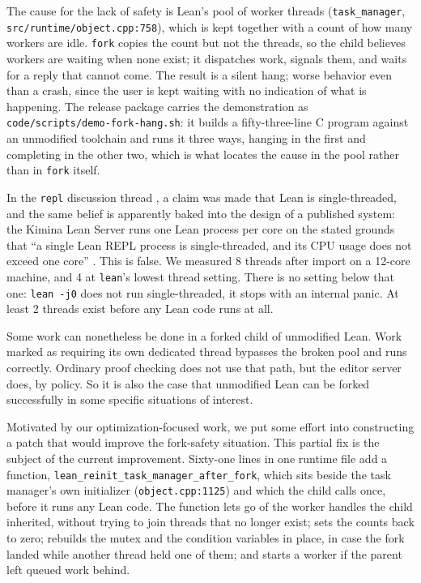 \documentclass{article}
\newcommand{\Lean}{Lean\xspace}      %
\newcommand{\lean}{\texttt{lean}\xspace}      %
\begin{document}
The cause for the lack of safety is \Lean's pool of worker threads (\texttt{task\_manager}, \texttt{src/runtime/\allowbreak object.cpp:758}), which is kept together with a count of how many workers are idle. \texttt{fork} copies the count but not the threads, so the child believes workers are waiting when none exist; it dispatches work, signals them, and waits for a reply that cannot come. The result is a silent hang; worse behavior even than a crash, since the user is kept waiting with no indication of what is happening. The release package carries the demonstration as \texttt{code/scripts/\allowbreak demo-fork-hang.sh}: it builds a fifty-three-line C program against an unmodified toolchain and runs it three ways, hanging in the first and completing in the other two, which is what locates the cause in the pool rather than in \texttt{fork} itself.

In the \texttt{repl} discussion thread \cite{repl84}, a claim was made that \Lean is single-threaded, and the same belief is apparently baked into the design of a published system: the Kimina Lean Server runs one \Lean process per core on the stated grounds that ``a single Lean REPL process is single-threaded, and its CPU usage does not exceed one core'' \cite[Sec.~3]{kimina}. This is false. We measured 8 threads after import on a 12-core machine, and 4 at \lean's lowest thread setting. There is no setting below that one: \texttt{lean -j0} does not run single-threaded, it stops with an internal panic. At least 2 threads exist before any \Lean code runs at all.

Some work can nonetheless be done in a forked child of unmodified \Lean. Work marked as requiring its own dedicated thread bypasses the broken pool and runs correctly. Ordinary proof checking does not use that path, but the editor server does, by policy. So it is also the case that unmodified \Lean can be forked successfully in some specific situations of interest.

Motivated by our optimization-focused work, we put some effort into constructing a patch that would improve the fork-safety situation. This partial fix is the subject of the current improvement. 
Sixty-one lines in one runtime file add a function, \texttt{lean\_reinit\_\allowbreak task\_manager\_after\_fork}, which sits beside the task manager's own initializer (\texttt{object.cpp:1125}) and which the child calls once, before it runs any \Lean code. The function lets go of the worker handles the child inherited, without trying to join threads that no longer exist; sets the counts back to zero; rebuilds the mutex and the condition variables in place, in case the fork landed while another thread held one of them; and starts a worker if the parent left queued work behind.
\end{document}
